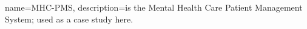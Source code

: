 {
  name=MHC-PMS,
  description={is the Mental Health Care Patient Management System;
  used as a case study here.}
}